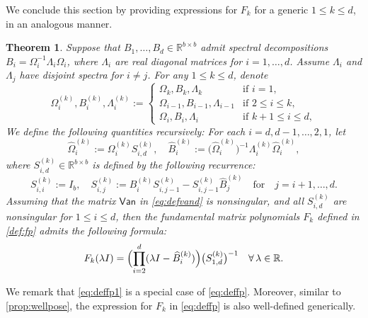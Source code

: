 \documentclass{article}
\newtheorem{theorem}{Theorem}
\newcommand{\defi}{:=}
\newcommand{\van}{\mathsf{Van}}
\newcommand{\fp}{F}
\newcommand{\R}{\mathbb{R}}
\begin{document}
We conclude this section by providing expressions for $\fp_{k}$ for a generic $1 \leq k \leq d$, in an analogous manner. 
\begin{theorem}
    \label{thm:Chain}
    Suppose that $B_{1},\dotsc,B_{d}\in\R^{b\times b}$ admit spectral decompositions $B_{i}=\Omega_{i}^{-1}\Lambda_{i}\Omega_{i}$, where $\Lambda_{i}$ are real diagonal matrices for $i=1,\dotsc,d$. Assume $\Lambda_{i}$ and $\Lambda_{j}$ have disjoint spectra for $i\neq j$. For any $1\leq k\leq d$, denote
    \begin{equation*}
        \Omega_{i}^{(k)},B_{i}^{(k)},\Lambda_{i}^{(k)} \defi 
        \begin{cases}
            \Omega_{k},B_{k},\Lambda_{k} & \text{if } i=1, \\
            \Omega_{i-1},B_{i-1},\Lambda_{i-1} & \text{if } 2\leq i\leq k, \\
            \Omega_{i},B_{i},\Lambda_{i}  & \text{if } k+1\leq i\leq d,
        \end{cases} 
    \end{equation*}  
    We define the following quantities recursively: For each $i=d,d-1,\dotsc,2,1$, let  
    \begin{equation*}
        \widehat{\Omega}_{i}^{(k)} \defi \Omega_{i}^{(k)}S_{i,d}^{(k)},\quad 
        \widehat{B}_{i}^{(k)}\defi \bigl(\widehat{\Omega}_{i}^{(k)}\bigr)^{-1}\Lambda_{i}^{(k)}\widehat{\Omega}_{i}^{(k)},
    \end{equation*}
    where $S_{i,d}^{(k)}\in\R^{b\times b}$ is defined by the following recurrence:
    \begin{equation*}
        S_{i,i}^{(k)} \defi  I_{b},\quad  S_{i,j}^{(k)} \defi  B_{i}^{(k)}S_{i,j-1}^{(k)}-S_{i,j-1}^{(k)}\widehat{B}_{j}^{(k)} \quad\text{for}\quad j=i+1,\dotsc,d.
    \end{equation*} 
    Assuming that the matrix $\van$ in \cref{eq:defvand} is nonsingular, and all $S_{i,d}^{(k)}$ are nonsingular for $1\leq i\leq d$, then the fundamental matrix polynomials $\fp_{k}$ defined in \cref{def:fp} admits the following formula: 
    \begin{equation}
    \label{eq:deffp}
        \fp_{k}(\lambda I) = \Bigl(\prod_{i=2}^{d}(\lambda I-\widehat{B}_{i}^{(k)})\Bigr)\bigl(S_{1,d}^{(k)}\bigr)^{-1}\quad \forall\, \lambda\in\R.
    \end{equation}
\end{theorem}

We remark that \cref{eq:deffp1} is a special case of \cref{eq:deffp}. Moreover, similar to \cref{prop:wellpose}, the expression for $\fp_{k}$ in \cref{eq:deffp} is also well-defined generically.
\end{document}
